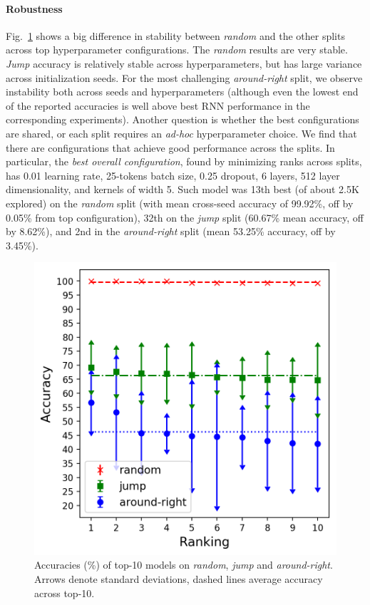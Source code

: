 \paragraph{Robustness} Fig.~\ref{fig:exp1} shows a big difference in
stability between \emph{random} and the other splits across top
hyperparameter configurations. The \emph{random} results are very
stable. \emph{Jump} accuracy is relatively stable across
hyperparameters, but has large variance across initialization
seeds. For the most challenging \emph{around-right} split, we observe
instability both across seeds and hyperparameters (although even the
lowest end of the reported accuracies is well above best RNN
performance in the corresponding experiments). Another question is
whether the best configurations are shared, or each split requires an
\emph{ad-hoc} hyperparameter choice. We find that there are configurations
that achieve good performance across the splits. In particular, the
\emph{best overall configuration}, found by minimizing ranks across
splits, has 0.01 learning rate, 25-tokens batch size, 0.25
dropout, 6 layers, 512 layer dimensionality, and kernels of width
5. Such model was 13th best (of about 2.5K explored) on the
\emph{random} split (with mean cross-seed accuracy of 99.92\%, off
by 0.05\% from top configuration), 32th on the \emph{jump} split
(60.67\% mean accuracy, off by 8.62\%), and 2nd in the
\emph{around-right} split (mean 53.25\% accuracy, off by 3.45\%).

\begin{figure}[tb]
    \includegraphics[width=.45\textwidth,keepaspectratio]{figures/accuracies_all_splits.png}
    \centering
    \caption{Accuracies (\%) of top-10 models on \emph{random}, \emph{jump} and \emph{around-right}. Arrows
      denote standard deviations, dashed lines average accuracy across top-10.
      }
    \label{fig:exp1}
\end{figure}

